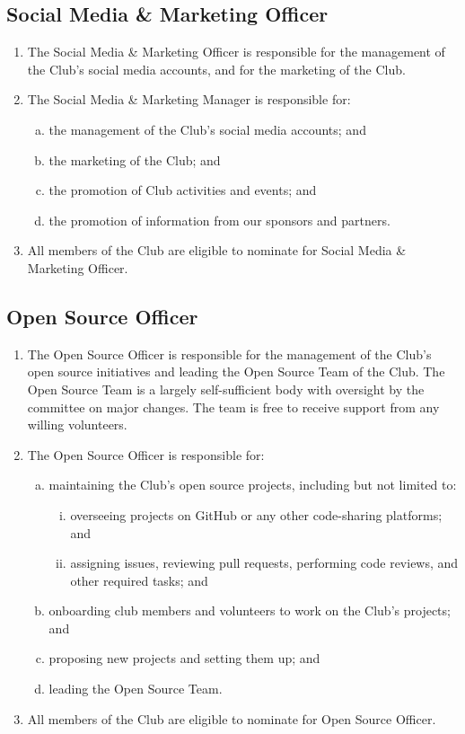 \documentclass{schedule}
\begin{document}
\subsection{Social Media \& Marketing Officer}
\begin{enumerate}[(1)]
    \item The Social Media \& Marketing Officer is responsible for the management of the Club's social media accounts, and for the marketing of the Club.
    \item The Social Media \& Marketing Manager is responsible for:
          \begin{enumerate}[(a)]
              \item the management of the Club's social media accounts; and
              \item the marketing of the Club; and
              \item the promotion of Club activities and events; and
              \item the promotion of information from our sponsors and partners.
          \end{enumerate}
    \item All members of the Club are eligible to nominate for Social Media \& Marketing Officer.
\end{enumerate}

\subsection{Open Source Officer}
\begin{enumerate}[(1)]
    \item The Open Source Officer is responsible for the management of the Club's open source initiatives and leading the Open Source Team of the Club. The Open Source Team is a largely self-sufficient body with oversight by the committee on major changes. The team is free to receive support from any willing volunteers.
    \item The Open Source Officer is responsible for:
          \begin{enumerate}[(a)]
              \item maintaining the Club's open source projects, including but not limited to:
                    \begin{enumerate}[(i)]
                        \item overseeing projects on GitHub or any other code-sharing platforms; and
                        \item assigning issues, reviewing pull requests, performing code reviews, and other required tasks; and
                    \end{enumerate}
              \item onboarding club members and volunteers to work on the Club's projects; and
              \item proposing new projects and setting them up; and
              \item leading the Open Source Team.
          \end{enumerate}
    \item All members of the Club are eligible to nominate for Open Source Officer.
\end{enumerate}
\end{document}
